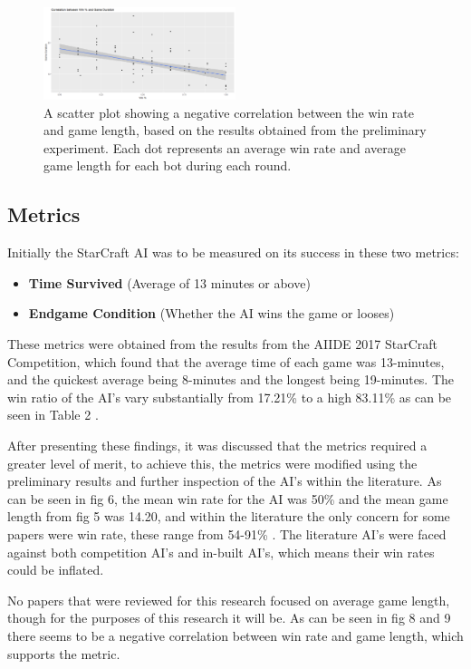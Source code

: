 \documentclass[journal]{IEEEtran}
\begin{document}
\begin{figure}[H]
	\centering
	\includegraphics[width=0.5\textwidth]{ScatterWinvsDurLine}
	\caption{A scatter plot showing a negative correlation between the win rate and game length, based on the results obtained from the preliminary experiment. Each dot represents an average win rate and average game length for each bot during each round.}
	\label{Fig8}
\end{figure}
\subsection{Metrics}

Initially the StarCraft AI was to be measured on its success in these two metrics:
\begin{itemize}
	\item \textbf{Time Survived} (Average of 13 minutes or above)
	\item \textbf{Endgame Condition} (Whether the AI wins the game or looses)
\end{itemize}
These metrics were obtained from the results from the AIIDE 2017 StarCraft Competition, which found that the average time of each game was 13-minutes, and the quickest average being 8-minutes and the longest being 19-minutes. The win ratio of the AI's vary substantially from 17.21\% to a high 83.11\% as can be seen in Table 2 \cite{Results}. 

After presenting these findings, it was discussed that the metrics required a greater level of merit, to achieve this, the metrics were modified using the preliminary results and further inspection of the AI's within the literature. As can be seen in fig 6, the mean win rate for the AI was 50\% and the mean game length from fig 5 was 14.20, and within the literature the only concern for some papers were win rate, these range from 54-91\% \cite{ELGoal,Swen,OnlineEvo,GoalDriven}. The literature AI's were faced against both competition AI's and in-built AI's, which means their win rates could be inflated.

No papers that were reviewed for this research focused on average game length, though for the purposes of this research it will be. As can be seen in fig 8 and 9 there seems to be a negative correlation between win rate and game length, which supports the metric.
\newline
\end{document}
